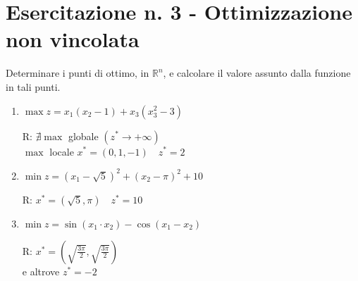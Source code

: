 \documentclass[italian,12pt]{article}
\begin{document}
\pagestyle{empty}

\section*{Esercitazione n. 3 - Ottimizzazione non vincolata}

Determinare i punti di ottimo, in $\mathbb{R}^n$, e calcolare il valore assunto dalla funzione in tali punti.


\begin{enumerate}
	\item 
	\begin{minipage}{0.50\textwidth}
		$\max z = x_1 (x_2 - 1) + x_3 (x_3^2 - 3)$
	\end{minipage}
	\begin{minipage}{0.40\textwidth}
		\begin{flushright}
			R: $\nexists \max$ globale $(z^* \rightarrow +\infty)$\\
			$\max$ locale $x^* = (0, 1, -1) \quad z^* = 2$
		\end{flushright}
	\end{minipage}
	
	\item 
	\begin{minipage}{0.50\textwidth}
		$\min z = (x_1 - \sqrt{5})^2 + (x_2 - \pi)^2 + 10$
	\end{minipage}
	\begin{minipage}{0.40\textwidth}
		\begin{flushright}
			R: $x^* = (\sqrt{5}, \pi) \quad z^* = 10$
		\end{flushright}
	\end{minipage}
	
	\item 
	\begin{minipage}{0.50\textwidth}
		$\min z = \sin(x_1 \cdot x_2) - \cos(x_1 - x_2)$
	\end{minipage}
	\begin{minipage}{0.40\textwidth}
		\begin{flushright}
			R: $x^* = \left(\sqrt{\frac{3\pi}{2}}, \sqrt{\frac{3\pi}{2}}\right)$\\
			e altrove $z^* = -2$
		\end{flushright}
	\end{minipage}
	

\end{enumerate}
\end{document}
